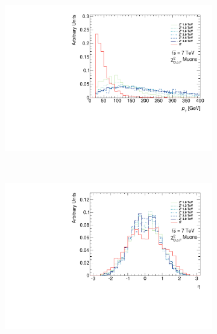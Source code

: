 \begin{figure}
\begin{subfigure}{0.49\linewidth}
\includegraphics[width=\textwidth]{PartBoosted/Plots/h_smt_pt.pdf}
\end{subfigure}
~
\begin{subfigure}{0.49\linewidth}
\includegraphics[width=\textwidth]{PartBoosted/Plots/h_smt_eta.pdf}
\end{subfigure}


\end{figure}
